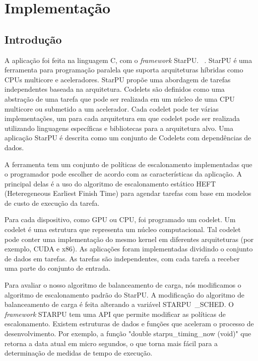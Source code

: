 \pagestyle{empty}
\cleardoublepage
\pagestyle{fancy}

\chapter{Implementação}\label{cap5}

\section{Introdução}\label{cap5:intro}

A aplicação foi feita na linguagem C, com o \emph{framework} StarPU. ~\cite{starpu}. StarPU  é uma ferramenta para programação paralela que suporta 
arquiteturas híbridas como CPUs multicore e aceleradores.  StarPU propõe 
uma abordagem de tarefas independentes baseada na arquitetura. Codelets são definidos como uma 
abstração de uma tarefa que pode ser realizada em um núcleo de uma CPU multicore ou 
submetido a um acelerador. Cada codelet pode ter várias implementações, um 
para cada arquitetura em que codelet pode ser realizada utilizando linguagens específicas 
e bibliotecas para a arquitetura alvo. Uma aplicação StarPU é descrita como  
um conjunto de Codelets com dependências de dados. 

A ferramenta tem um conjunto de políticas de escalonamento implementadas que o programador pode 
escolher de acordo com as características da aplicação. A principal delas é a 
uso do algoritmo de escalonamento estático HEFT (Heteregeneous Earliest Finish Time) para 
agendar tarefas com base em modelos de custo de execução da tarefa. 

Para cada dispositivo, como GPU ou CPU, foi programado um codelet. Um codelet é uma estrutura que representa um núcleo computacional. Tal codelet pode conter uma implementação do mesmo kernel em diferentes 
arquiteturas (por exemplo, CUDA e x86). As aplicações foram implementadas  
dividindo o conjunto de dados em tarefas. As tarefas são 
independentes, com cada tarefa a receber uma parte do conjunto de entrada. 

Para avaliar o nosso algoritmo de balanceamento de carga, nós modificamos o algoritmo de escalonamento padrão do StarPU. A modificação do algoritmo de balanceamento de carga é feita alterando a variável STARPU\ _SCHED. O \emph{framework} STARPU tem uma API que permite modificar as políticas de escalonamento. Existem estruturas de dados e funções que aceleram o processo de desenvolvimento. Por exemplo, a função "double starpu\_timing\_now (void)" que retorna a data atual em micro segundos, o que torna mais fácil para a determinação de medidas de tempo de execução. 

